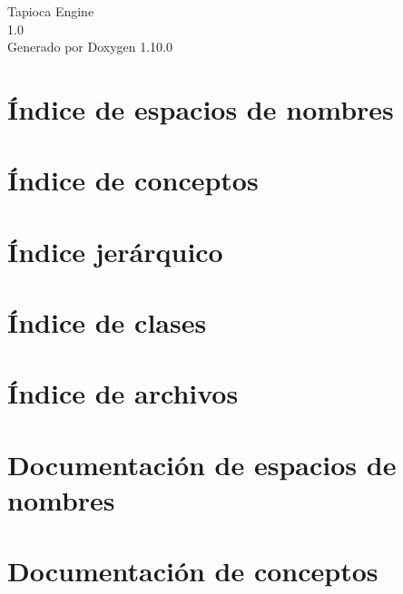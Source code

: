 \documentclass[twoside]{book}
\newcommand{\+}{\discretionary{\mbox{\scriptsize$\hookleftarrow$}}{}{}}
\newcommand{\clearemptydoublepage}{%
    \newpage{\pagestyle{empty}\cleardoublepage}%
  }
\begin{document}
  \raggedbottom
    \hypersetup{pageanchor=false,
                bookmarksnumbered=true,
                pdfencoding=unicode
               }
  \begin{titlepage}
  \vspace*{7cm}
  \begin{center}%
  {\Large Tapioca Engine}\\
  [1ex]\large 1.\+0 \\
  \vspace*{1cm}
  {\large Generado por Doxygen 1.10.0}\\
  \end{center}
  \end{titlepage}
  \clearemptydoublepage
  \tableofcontents
  \clearemptydoublepage
  \hypersetup{pageanchor=true}
\chapter{Índice de espacios de nombres}

\chapter{Índice de conceptos}

\chapter{Índice jerárquico}

\chapter{Índice de clases}

\chapter{Índice de archivos}

\chapter{Documentación de espacios de nombres}







\chapter{Documentación de conceptos}

\end{document}
